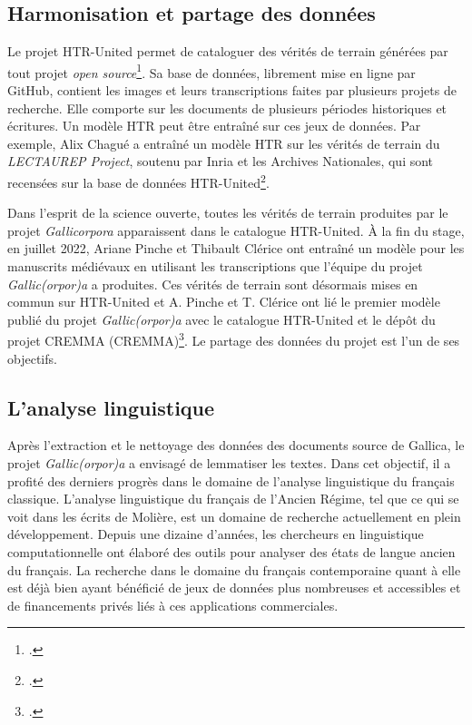 \documentclass[class=article, crop=false]{standalone}
\begin{document}
\subsection{Harmonisation et partage des données}
Le projet \Gls{HTR-United} permet de cataloguer des vérités de terrain générées par tout projet \textit{open source}\footcite{chagueHTRUnitedHtrunitedV02022}. Sa base de données, librement mise en ligne par GitHub, contient les images et leurs transcriptions faites par plusieurs projets de recherche. Elle comporte sur les documents de plusieurs périodes historiques et écritures. Un modèle \acrshort{HTR} peut être entraîné sur ces jeux de données. Par exemple, Alix Chagué a entraîné un modèle \acrshort{HTR} sur les vérités de terrain du \textit{LECTAUREP Project}, soutenu par \Gls{Inria} et les Archives Nationales, qui sont recensées sur la base de données \Gls{HTR-United}\footcite{chagueLECTAUREPContemporaryFrench2022}.

Dans l'esprit de la science ouverte, toutes les vérités de terrain produites par le projet \textit{Gallicorpora} apparaissent dans le catalogue \Gls{HTR-United}. À la fin du stage, en juillet 2022, Ariane Pinche et Thibault Clérice ont entraîné un modèle pour les manuscrits médiévaux en utilisant les transcriptions que l'équipe du projet \textit{Gallic(orpor)a} a produites. Ces vérités de terrain sont désormais mises en commun sur \Gls{HTR-United} et A. Pinche et T. Clérice ont lié le premier modèle publié du projet \textit{Gallic(orpor)a} avec le catalogue \Gls{HTR-United} et le dépôt du projet \acrshort{CREMMA} (\acrlong{CREMMA})\footcite{pincheHTRUnitedCremmamedievalCortado2022}. Le partage des données du projet est l'un de ses objectifs.

\subsection{L'analyse linguistique}
Après l'extraction et le nettoyage des données des documents source de Gallica, le projet \textit{Gallic(orpor)a} a envisagé de lemmatiser les textes. Dans cet objectif, il a profité des derniers progrès dans le domaine de l'analyse linguistique du français classique. L'analyse linguistique du français de l'Ancien Régime, tel que ce qui se voit dans les écrits de Molière, est un domaine de recherche actuellement en plein développement. Depuis une dizaine d'années, les chercheurs en linguistique computationnelle ont élaboré des outils pour analyser des états de langue ancien du français. La recherche dans le domaine du français contemporaine quant à elle est déjà bien ayant bénéficié de jeux de données plus nombreuses et accessibles et de financements privés liés à ces applications commerciales.
\end{document}
